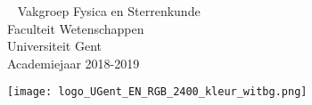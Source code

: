 \vspace{1cm}

\noindent\begin{minipage}{0.7\textwidth}
~\vfill
{\Large Vakgroep Fysica en Sterrenkunde\\
Faculteit Wetenschappen\\
Universiteit Gent\\
Academiejaar 2018-2019}
\end{minipage}
\hfill%
\begin{minipage}{0.3\textwidth}
\begin{flushright}
\texttt{[image: logo\_UGent\_EN\_RGB\_2400\_kleur\_witbg.png]}

\end{flushright}\end{minipage}%